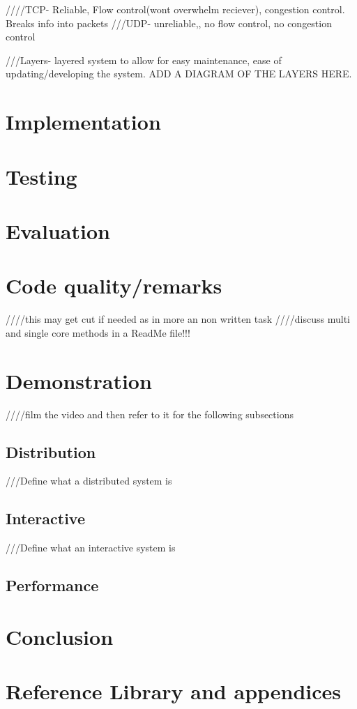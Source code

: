 \documentclass[8pt, a4paper]{article}
\begin{document}
////TCP- Reliable, Flow control(wont overwhelm reciever), congestion control. Breaks info into packets
///UDP- unreliable,, no flow control, no congestion control

///Layers- layered system to allow for easy maintenance, ease of updating/developing the system. ADD A DIAGRAM OF THE LAYERS HERE. 

\section{Implementation}


\section{Testing}

\section{Evaluation}


\section{Code quality/remarks} ////this may get cut if needed as in more an non written task
////discuss multi and single core methods in a ReadMe file!!!


\section{Demonstration}
////film the video and then refer to it for the following subsections


\subsection{Distribution}
///Define what a distributed system is 

\subsection{Interactive}
///Define what an interactive system is

\subsection{Performance}






\section{Conclusion}


\section{Reference Library and appendices}
\end{document}

